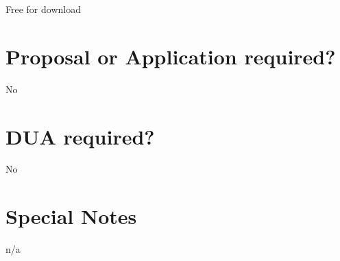 \documentclass[
]{book}
\begin{document}
Free for download

\hypertarget{proposal-or-application-required-98}{%
\section{Proposal or Application required?}\label{proposal-or-application-required-98}}

No

\hypertarget{dua-required-98}{%
\section{DUA required?}\label{dua-required-98}}

No

\hypertarget{special-notes-98}{%
\section{Special Notes}\label{special-notes-98}}

n/a

  
\end{document}
